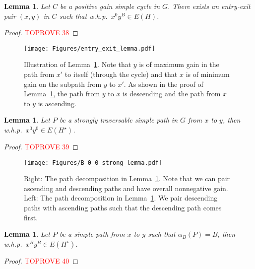 \documentclass[11pt]{article}
\newtheorem{lemma}[theorem]{Lemma}
\begin{document}
\begin{lemma}\label{lemma:special-entry-exit}
    Let $C$ be a positive gain simple cycle in $G$. There exists an entry-exit pair $(x,y)$ in $C$ such that w.h.p.\ $x^0 y^B \in E(H)$.
\end{lemma}

\begin{proof}\textcolor{red}{TOPROVE 38}\end{proof}


\begin{figure}
    \centering
\texttt{[image: Figures/entry\_exit\_lemma.pdf]}
\caption{Illustration of Lemma~\ref{lemma:special-entry-exit}. Note that $y$ is of maximum gain in the path from $x'$ to itself (through the cycle) and that $x$ is of minimum gain on the subpath from $y$ to $x'$. 
As shown in the proof of Lemma~\ref{lemma:special-entry-exit}, the path from $y$ to $x$ is descending and 
the path from $x$ to $y$ is ascending.}
\label{fig:entry-exit-cycle}
\end{figure}


\begin{lemma}\label{lemma:0-0-strong}
    Let $P$ be a strongly traversable simple path in $G$ from $x$ to $y$, then w.h.p.\ $x^0 y^0 \in E(H^\star)$.
\end{lemma}

\begin{proof}\textcolor{red}{TOPROVE 39}\end{proof}

\begin{figure}
    \centering
\texttt{[image: Figures/B\_0\_0\_strong\_lemma.pdf]}
\caption{Right: The path decomposition in Lemma~\ref{lemma:0-0-strong}. Note that we can pair ascending and descending paths and have overall nonnegative gain. Left: The path decomposition in Lemma~\ref{lemma:B-B-strong}. We pair descending paths with ascending paths such that the descending path comes first.}
\label{fig:path-zig-zag-decomposition}
\end{figure}



\begin{lemma}\label{lemma:B-B-strong}
Let $P$ be a simple path from $x$ to $y$ such that $\alpha_B(P)= B$, then w.h.p.\ $x^B y^B \in E(H^\star)$.    
\end{lemma}

\begin{proof}\textcolor{red}{TOPROVE 40}\end{proof}
\end{document}
